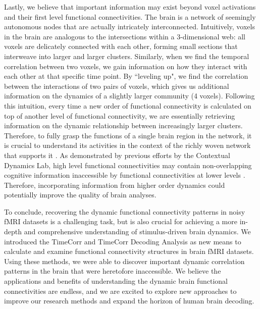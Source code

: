\documentclass[11pt]{article}
\begin{document}
Lastly, we believe that important information may exist beyond voxel activations and their first level functional connectivities. The brain is a network of seemingly autonomous nodes that are actually intricately interconnected. Intuitively, voxels in the brain are analogous to the intersections within a 3-dimensional web: all voxels are delicately connected with each other, forming small sections that interweave into larger and larger clusters. Similarly, when we find the temporal correlation between two voxels, we gain information on how they interact with each other at that specific time point. By ``leveling up", we find the correlation between the interactions of two pairs of voxels, which gives us additional information on the dynamics of a slightly larger community (4 voxels). Following this intuition, every time a new order of functional connectivity is calculated on top of another level of functional connectivity, we are essentially retrieving information on the dynamic relationship between increasingly larger clusters. Therefore, to fully grasp the functions of a single brain region in the network, it is crucial to understand its activities in the context of the richly woven network that supports it \citep{Battiston2017}. As demonstrated by previous efforts by the Contextual Dynamics Lab, high level functional connectivities may contain non-overlapping cognitive information inaccessible by functional connectivities at lower levels \citep{jeremy2017}. Therefore, incorporating information from higher order dynamics could potentially improve the quality of brain analyses.

To conclude, recovering the dynamic functional connectivity patterns in noisy fMRI datasets is a challenging task, but is also crucial for achieving a more in-depth and comprehensive understanding of stimulus-driven brain dynamics. We introduced the TimeCorr and TimeCorr Decoding Analysis as new means to calculate and examine functional connectivity structures in brain fMRI datasets. Using these methods, we were able to discover important dynamic correlation patterns in the brain that were heretofore inaccessible. We believe the applications and benefits of understanding the dynamic brain functional connectivities are endless, and we are excited to explore new approaches to improve our research methods and expand the horizon of human brain decoding.

\newpage


\end{document}

